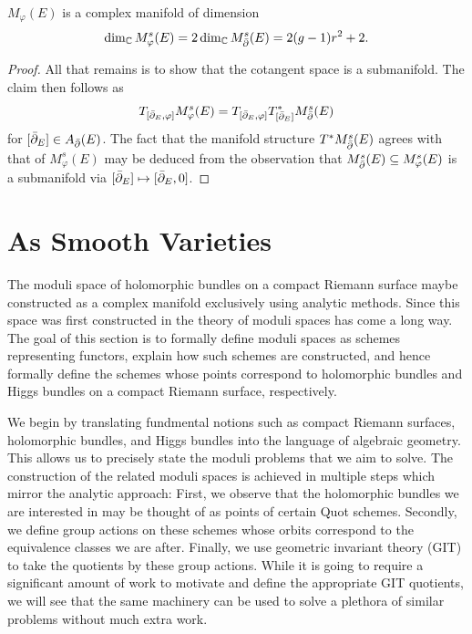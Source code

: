 \documentclass[12pt]{ociamthesis}  %
\begin{document}
\begin{corollary}
  $M_\varphi(E)$ is a complex manifold of dimension
  \begin{align*}
    \dim_{\mathbb C}M^s_{\varphi}(E)
    =2\dim_{\mathbb C}M^s_{\bar{\partial}}(E)
    =2(g-1)r^2 + 2.
  \end{align*}
  \begin{proof}
    All that remains is to show that the cotangent space is a submanifold.
    The claim then follows as
    \begin{align*}
      T_{[{\bar{\partial}}_E,\varphi]}M^s_\varphi(E) = T_{[{\bar{\partial}}_E,\varphi]} T^*_{[{\bar{\partial}}_E]}M^s_{\bar{\partial}}(E)
    \end{align*}
    for $[{\bar{\partial}}_E]\in A_{\bar{\partial}}(E)$. The fact that the manifold
    structure $T^*M^s_{\bar{\partial}}(E)$ agrees with that of $M^s_{\varphi}(E)$
    may be deduced from the observation that
    $M^s_{\bar{\partial}}(E) \subseteq M^s_\varphi(E)$ is a submanifold
    via $[{\bar{\partial}}_E] \mapsto [{\bar{\partial}}_E,0]$.
  \end{proof}
\end{corollary}

\chapter{As Smooth Varieties}

The moduli space of holomorphic bundles on a compact Riemann
surface maybe constructed as a complex manifold exclusively
using analytic methods. Since this space was first constructed
in \missingcitation
the theory of moduli spaces has come a long way.
The goal of this section is to formally define moduli spaces
as schemes representing functors, explain how such schemes
are constructed, and hence formally define the schemes whose
points correspond to holomorphic bundles and Higgs bundles
on a compact Riemann surface, respectively.

We begin by translating fundmental notions such as compact
Riemann surfaces, holomorphic bundles, and Higgs bundles into
the language of algebraic geometry. This allows us to precisely state
the moduli problems that we aim to solve. The construction
of the related moduli spaces is achieved in multiple steps which
mirror the analytic approach: First, we observe that the
holomorphic bundles we are interested in may be thought of as
points of certain Quot schemes. Secondly, we define group
actions on these schemes whose orbits correspond to the
equivalence classes we are after. Finally, we use geometric
invariant theory (GIT) to take the quotients by these group
actions. While it is going to require a significant amount of
work to motivate and define the appropriate GIT quotients,
we will see that the same machinery can be used to solve
a plethora of similar problems without much extra work.
\end{document}
